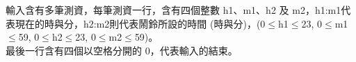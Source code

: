輸入含有多筆測資，每筆測資一行，含有四個整數 h1、m1、h2 及 m2，h1:m1代表現在的時與分，h2:m2則代表鬧鈴所設的時間 (時與分)，(0$\leq$h1$\leq$23, 0$\leq$m1$\leq$59, 0$\leq$h2$\leq$23, 0$\leq$m2$\leq$59)。\\
最後一行含有四個以空格分開的 0，代表輸入的結束。\\
